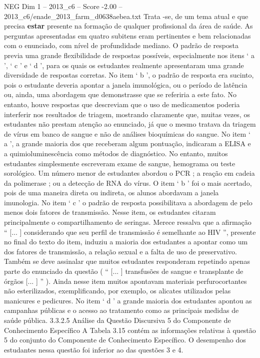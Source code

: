 \begin{textsample}{NEG Dim 1 – 2013\_c6 – Score -2.00 – 2013\_c6/enade\_2013\_farm\_d0638aebea.txt}
Trata -se, de um tema atual e que precisa \textbf{estar} presente na formação de qualquer profissional da área de saúde.
As perguntas apresentadas em quatro subitens eram pertinentes e bem relacionadas com o enunciado, com nível de profundidade mediano.
O padrão de resposta previa uma grande flexibilidade de respostas possíveis, especialmente nos itens ‘ a ’, ‘ c ’ e ‘ d ’, para os quais os estudantes realmente apresentaram uma grande diversidade de respostas corretas.
No item ‘ b ’, o padrão de resposta era sucinto, pois o estudante deveria apontar a janela imunológica, ou o período de latência ou, ainda, uma abordagem que demonstrasse que se referiria a este fato.
No entanto, houve respostas que descreviam que o uso de medicamentos poderia interferir nos resultados de triagem, mostrando claramente que, muitas vezes, os estudantes não prestam atenção ao enunciado, já que o mesmo tratava da triagem de vírus em banco de sangue e não de análises bioquímicas do sangue.
No item ‘ a ’, a grande maioria dos que receberam algum pontuação, indicaram a ELISA e a quimioluminescência como métodos de diagnóstico.
No entanto, muitos estudantes simplesmente escreveram exame de sangue, hemograma ou teste sorológico.
Um número menor de estudantes abordou o PCR ; a reação em cadeia da polimerase ; ou a detecção de RNA do vírus.
O item ‘ b ’ foi o mais acertado, pois de uma maneira direta ou indireta, os alunos abordavam a janela imunologia.
No item ‘ c ’ o padrão de resposta possibilitava a abordagem de pelo menos dois fatores de transmissão.
Nesse item, os estudantes citaram principalmente o compartilhamento de seringas.
Merece ressalva que a afirmação “ [... ] considerando que seu perfil de transmissão é semelhante ao HIV ”, presente no final do texto do item, induziu a maioria dos estudantes a apontar como um dos fatores de transmissão, a relação sexual e a falta de uso de preservativo.
Também se deve assinalar que muitos estudantes responderam repetindo apenas parte do enunciado da questão ( “ [... ] transfusões de sangue e transplante de órgãos [... ] ” ).
Ainda nesse item muitos apontavam materiais perfurocortantes não esterilizados, exemplificando, por exemplo, os alicates utilizados pelas manicures e pedicures.
No item ‘ d ’ a grande maioria dos estudantes apontou as campanhas públicas e o acesso ao tratamento como as principais medidas de saúde pública. 3.3.2.5 Análise da Questão Discursiva 5 do Componente de Conhecimento Específico A Tabela 3.15 contém as informações relativas à questão 5 do conjunto do Componente de Conhecimento Específico.
O desempenho dos estudantes nessa questão foi inferior ao das questões 3 e 4.

\end{textsample}

